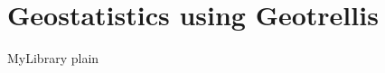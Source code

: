 \documentclass {article}
\begin{document}
  

\section {Geostatistics using Geotrellis}

 {MyLibrary}
 {plain}
\end{document}
